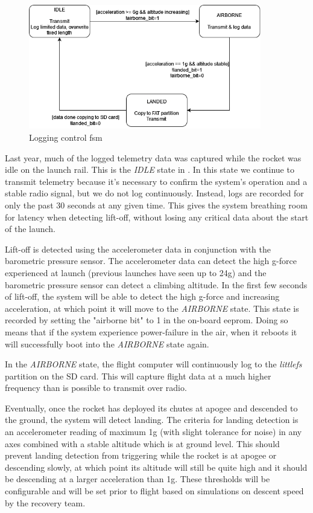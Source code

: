 \begin{figure}[H]
    \centering
    \includegraphics[width=4in]{./assets/diagrams/Flight State FSM.png}
    \caption{Logging control \gls{fsm}}
    \label{fig:logging-fsm}
\end{figure}

Last year, much of the logged telemetry data was captured while the rocket was idle on the launch rail. This is the
\textit{IDLE} state in . In this state we continue to transmit telemetry because it's necessary
to confirm the system's operation and a stable radio signal, but we do not log continuously. Instead, logs are recorded
for only the past 30 seconds at any given time. This gives the system breathing room for latency when detecting
lift-off, without losing any critical data about the start of the launch.

Lift-off is detected using the accelerometer data in conjunction with the barometric pressure sensor. The accelerometer
data can detect the high g-force experienced at launch (previous launches have seen up to 24g) and the barometric
pressure sensor can detect a climbing altitude. In the first few seconds of lift-off, the system will be able to detect
the high g-force and increasing acceleration, at which point it will move to the \textit{AIRBORNE} state. This state is
recorded by setting the "airborne bit" to 1 in the on-board \gls{eeprom}. Doing so means that if the system experience
power-failure in the air, when it reboots it will successfully boot into the \textit{AIRBORNE} state again.

In the \textit{AIRBORNE} state, the flight computer will continuously log to the \textit{littlefs} partition on the SD
card. This will capture flight data at a much higher frequency than is possible to transmit over radio.

Eventually, once the rocket has deployed its chutes at apogee and descended to the ground, the system will detect
landing. The criteria for landing detection is an accelerometer reading of maximum 1g (with slight tolerance for noise)
in any axes combined with a stable altitude which is at ground level. This should prevent landing detection from
triggering while the rocket is at apogee or descending slowly, at which point its altitude will still be quite high and
it should be descending at a larger acceleration than 1g. These thresholds will be configurable and will be set prior
to flight based on simulations on descent speed by the recovery team.

